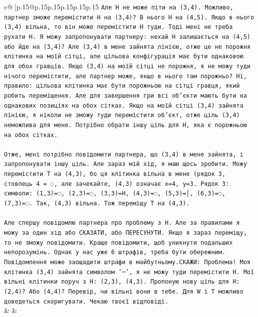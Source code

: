 \documentclass{article}
\begin{document}
{\begin{supertabular}{c@{$\;$}|p{.15\linewidth}@{}p{.15\linewidth}p{.15\linewidth}p{.15\linewidth}p{.15\linewidth}p{.15\linewidth}}
{{{\texttt{Але H не може піти на (3,4). Можливо, партнер зможе перемістити H на (3,4)? В нього H на (4,5). Якщо в нього (3,4) вільна, то він може перемістити H туди. Тоді мені не треба рухати H. Я можу запропонувати партнеру: нехай H залишається на (4,5) або йде на (3,4)? Але (3,4) в мене зайнята лінією, отже це не порожня клітинка на моїй сітці, але цільова конфігурація має бути однаковою для обох гравців. Якщо (3,4) на моїй сітці не порожня, я не можу туди нічого перемістити, але партнер може, якщо в нього там порожньо? Ні, правило: цільова клітинка має бути порожньою на сітці гравця, який робить переміщення. Але для завершення гри всі об'єкти мають бути на однакових позиціях на обох сітках. Якщо на моїй сітці (3,4) зайнята лінією, я ніколи не зможу туди перемістити об'єкт, отже ціль (3,4) неможлива для мене. Потрібно обрати іншу ціль для H, яка є порожньою на обох сітках.} \\
\\ 
\texttt{Отже, мені потрібно повідомити партнера, що (3,4) в мене зайнята, і запропонувати іншу ціль. Але зараз мій хід, я маю щось зробити. Можу перемістити T на (4,3), бо ця клітинка вільна в мене (рядок 3, стовпець 4 = ◌, але зачекайте, (4,3) означає x=4, y=3. Рядок 3: символи: (1,3)=◌, (2,3)=◌, (3,3)=H, (4,3)=◌, (5,3)=│, (6,3)=◌, (7,3)=◌. Так, (4,3) вільна. Тож переміщу T на (4,3).} \\
\\ 
\texttt{Але спершу повідомлю партнера про проблему з H. Але за правилами я можу за один хід або СКАЗАТИ, або ПЕРЕСУНУТИ. Якщо я зараз переміщу, то не зможу повідомити. Краще повідомити, щоб уникнути подальших непорозумінь. Однак у нас уже 6 штрафів, треба бути обережним. Повідомлення може заощадити штрафи в майбутньому.СКАЖИ: Проблема! Моя клітинка (3,4) зайнята символом '─', я не можу туди перемістити H. Мої вільні клітинки поруч з H: (2,3), (4,3). Пропоную нову ціль для H: (2,4)? Або (4,4)? Перевір, чи вільні вони в тебе. Для W і T можливо доведеться скоригувати. Чекаю твоєї відповіді.} \\
            }
        }
    }
    & & \\ \\


\end{supertabular}}
\end{document}
